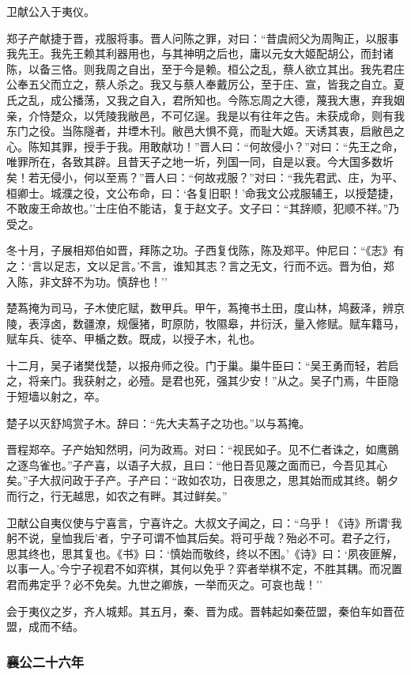 \documentclass[]{article}
\begin{document}
卫献公入于夷仪。

郑子产献捷于晋，戎服将事。晋人问陈之罪，对曰：``昔虞阏父为周陶正，以服事我先王。我先王赖其利器用也，与其神明之后也，庸以元女大姬配胡公，而封诸陈，以备三恪。则我周之自出，至于今是赖。桓公之乱，蔡人欲立其出。我先君庄公奉五父而立之，蔡人杀之。我又与蔡人奉戴厉公，至于庄、宣，皆我之自立。夏氏之乱，成公播荡，又我之自入，君所知也。今陈忘周之大德，蔑我大惠，弃我姻亲，介恃楚众，以凭陵我敝邑，不可亿逞。我是以有往年之告。未获成命，则有我东门之役。当陈隧者，井堙木刊。敝邑大惧不竟，而耻大姬。天诱其衷，启敝邑之心。陈知其罪，授手于我。用敢献功！''晋人曰：``何故侵小？''对曰：``先王之命，唯罪所在，各致其辟。且昔天子之地一圻，列国一同，自是以衰。今大国多数圻矣！若无侵小，何以至焉？''晋人曰：``何故戎服？''对曰：``我先君武、庄，为平、桓卿士。城濮之役，文公布命，曰：`各复旧职！'命我文公戎服辅王，以授楚捷，不敢废王命故也。''士庄伯不能诘，复于赵文子。文子曰：``其辞顺，犯顺不祥。''乃受之。

冬十月，子展相郑伯如晋，拜陈之功。子西复伐陈，陈及郑平。仲尼曰：``《志》有之：`言以足志，文以足言。'不言，谁知其志？言之无文，行而不远。晋为伯，郑入陈，非文辞不为功。慎辞也！''

楚蒍掩为司马，子木使庀赋，数甲兵。甲午，蒍掩书土田，度山林，鸠薮泽，辨京陵，表淳卤，数疆潦，规偃猪，町原防，牧隰皋，井衍沃，量入修赋。赋车籍马，赋车兵、徒卒、甲楯之数。既成，以授子木，礼也。

十二月，吴子诸樊伐楚，以报舟师之役。门于巢。巢牛臣曰：``吴王勇而轻，若启之，将亲门。我获射之，必殪。是君也死，强其少安！''从之。吴子门焉，牛臣隐于短墙以射之，卒。

楚子以灭舒鸠赏子木。辞曰：``先大夫蒍子之功也。''以与蒍掩。

晋程郑卒。子产始知然明，问为政焉。对曰：``视民如子。见不仁者诛之，如鹰鸇之逐鸟雀也。''子产喜，以语子大叔，且曰：``他日吾见蔑之面而已，今吾见其心矣。''子大叔问政于子产。子产曰：``政如农功，日夜思之，思其始而成其终。朝夕而行之，行无越思，如农之有畔。其过鲜矣。''

卫献公自夷仪使与宁喜言，宁喜许之。大叔文子闻之，曰：``乌乎！《诗》所谓`我躬不说，皇恤我后'者，宁子可谓不恤其后矣。将可乎哉？殆必不可。君子之行，思其终也，思其复也。《书》曰：`慎始而敬终，终以不困。'《诗》曰：`夙夜匪解，以事一人。'今宁子视君不如弈棋，其何以免乎？弈者举棋不定，不胜其耦。而况置君而弗定乎？必不免矣。九世之卿族，一举而灭之。可哀也哉！''

会于夷仪之岁，齐人城郏。其五月，秦、晋为成。晋韩起如秦莅盟，秦伯车如晋莅盟，成而不结。

\hypertarget{header-n2204}{%
\subsubsection{襄公二十六年}\label{header-n2204}}
\end{document}

